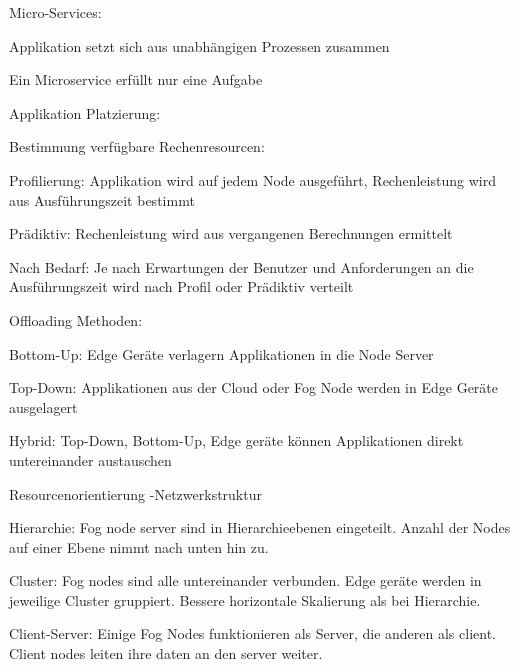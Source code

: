 \begin{notes}
\begin{notes}
\begin{notes}
\begin{notes}
                \item Micro-Services:
                    \item Applikation setzt sich aus unabhängigen Prozessen zusammen
                    \item Ein Microservice erfüllt nur eine Aufgabe
            \end{notes}
        \end{notes}
        \item Applikation Platzierung:
        \begin{notes}
            \item Bestimmung verfügbare Rechenresourcen:
            \begin{notes}
                \item Profilierung: Applikation wird auf jedem Node ausgeführt, Rechenleistung wird aus Ausführungszeit bestimmt
                \item Prädiktiv: Rechenleistung wird aus vergangenen Berechnungen ermittelt
                \item Nach Bedarf: Je nach Erwartungen der Benutzer und Anforderungen an die Ausführungszeit wird nach Profil oder Prädiktiv verteilt
            \end{notes}
            \item Offloading Methoden:
            \begin{notes}
                \item Bottom-Up: Edge Geräte verlagern Applikationen in die Node Server
                \item Top-Down: Applikationen aus der Cloud oder Fog Node werden in Edge Geräte ausgelagert
                \item Hybrid: Top-Down, Bottom-Up, Edge geräte können Applikationen direkt untereinander austauschen
            \end{notes}
            \item Resourcenorientierung -Netzwerkstruktur
            \begin{notes}
                \item Hierarchie: Fog node server sind in Hierarchieebenen eingeteilt. Anzahl der Nodes auf einer Ebene nimmt nach unten hin zu. 
                \item Cluster: Fog nodes sind alle untereinander verbunden. Edge geräte werden in jeweilige Cluster gruppiert. Bessere horizontale Skalierung als bei Hierarchie.
                \item Client-Server: Einige Fog Nodes funktionieren als Server, die anderen als client. Client nodes leiten ihre daten an den server weiter.

\end{notes}
\end{notes}
\end{notes}
\end{notes}
